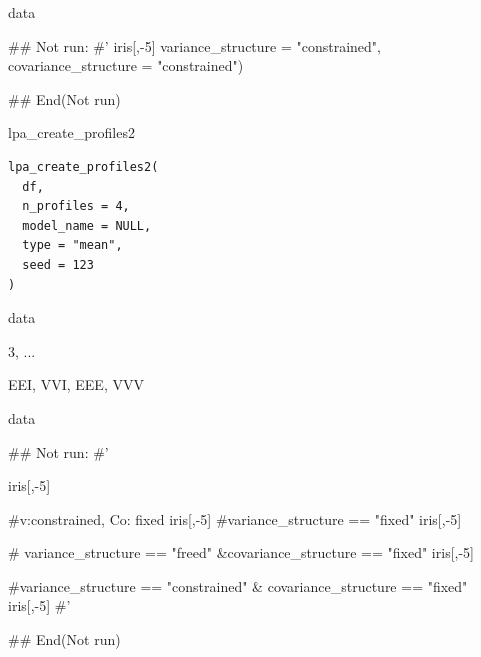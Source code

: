 \documentclass[a4paper]{book}
\begin{document}
%
\begin{Value}
data
\end{Value}
%
\begin{Examples}
\begin{ExampleCode}

## Not run: 
#'
iris[,-5]%
                                    variance_structure = "constrained",
                                    covariance_structure = "constrained")

## End(Not run)


\end{ExampleCode}
\end{Examples}
%
\begin{Description}
lpa\_create\_profiles2
\end{Description}
%
\begin{Usage}
\begin{verbatim}
lpa_create_profiles2(
  df,
  n_profiles = 4,
  model_name = NULL,
  type = "mean",
  seed = 123
)
\end{verbatim}
\end{Usage}
%
\begin{Arguments}
\begin{ldescription}
\item[\code{df}] data

\item[\code{n\_profiles}] 3, ...

\item[\code{model\_name}] EEI, VVI, EEE, VVV
\end{ldescription}
\end{Arguments}
%
\begin{Value}
data
\end{Value}
%
\begin{Examples}
\begin{ExampleCode}

## Not run: 
#'

iris[,-5] %

#v:constrained, Co: fixed
iris[,-5] %
#variance_structure == "fixed"
iris[,-5] %


# variance_structure == "freed" &covariance_structure == "fixed"
iris[,-5] %


#variance_structure == "constrained" & covariance_structure == "fixed"
iris[,-5] %
#'

## End(Not run)

\end{ExampleCode}
\end{Examples}
\end{document}
